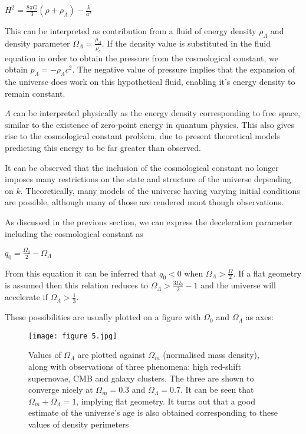 \begin{center}
    $H^2 = \frac{8\pi{G}}{3}(\rho+\rho_{\Lambda}) - \frac{k}{a^2}$
\end{center}

This can be interpreted as contribution from a fluid of energy density $\rho_{\Lambda}$ and density parameter $\Omega_{\Lambda} = \frac{\rho_{\Lambda}}{\rho_c}$. If the density value is substituted in the fluid equation in order to obtain the pressure from the cosmological constant, we obtain $p_{\Lambda} = -\rho_{\Lambda}c^2$. The negative value of pressure implies that the expansion of the universe does work on this hypothetical fluid, enabling it's energy density to remain constant. 

$\Lambda$ can be interpreted physically as the energy density corresponding to free space, similar to the existence of zero-point energy in quantum physics. This also gives rise to the cosmological constant problem, due to present theoretical models predicting this energy to be far greater than observed.

It can be observed that the inclusion of the cosmological constant no longer imposes many restrictions on the state and structure of the universe depending on $k$. Theoretically, many models of the universe having varying initial conditions are possible, although many of those are rendered moot though observations.

As discussed in the previous section, we can express the deceleration parameter including the cosmological constant as 

\begin{center}
    $q_0 = \frac{\Omega_0}{2} - \Omega_{\Lambda}$
\end{center}

From this equation it can be inferred that $q_0<0$ when $\Omega_{\Lambda} > \frac{\Omega}{2}$. If a flat geometry is assumed then this relation reduces to $\Omega_{\Lambda} >\frac{3\Omega_0}{2}-1 $ and the universe will accelerate if $\Omega_{\Lambda} > \frac{1}{3}$.


These possibilities are usually plotted on a figure with $\Omega_0$ and $\Omega_{\Lambda}$ as axes:

\begin{figure}[H]
    \centering
    \texttt{[image: figure 5.jpg]}
    \caption{Values of $\Omega_{\Lambda}$ are plotted against $\Omega_m$ (normalised mass density), along with observations of three phenomena: high red-shift supernovae, CMB and galaxy clusters. The three are shown to converge nicely at $\Omega_m = 0.3$ and $\Omega_{\Lambda} = 0.7$. It can be seen that $\Omega_m+\Omega_{\Lambda} =1$, implying flat geometry. It turns out that a good estimate of the universe's age is also obtained corresponding to these values of density perimeters}
    \label{fig:density}
\end{figure}


